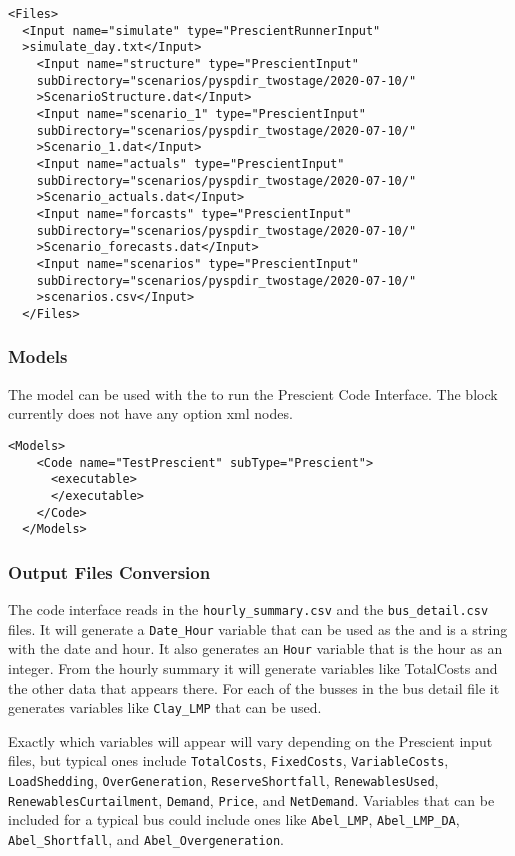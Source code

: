 \begin{lstlisting}[style=XML]
  <Files>
  <Input name="simulate" type="PrescientRunnerInput"
  >simulate_day.txt</Input>
    <Input name="structure" type="PrescientInput"
    subDirectory="scenarios/pyspdir_twostage/2020-07-10/"
    >ScenarioStructure.dat</Input>
    <Input name="scenario_1" type="PrescientInput"
    subDirectory="scenarios/pyspdir_twostage/2020-07-10/"
    >Scenario_1.dat</Input>
    <Input name="actuals" type="PrescientInput"
    subDirectory="scenarios/pyspdir_twostage/2020-07-10/"
    >Scenario_actuals.dat</Input>
    <Input name="forcasts" type="PrescientInput"
    subDirectory="scenarios/pyspdir_twostage/2020-07-10/"
    >Scenario_forecasts.dat</Input>
    <Input name="scenarios" type="PrescientInput"
    subDirectory="scenarios/pyspdir_twostage/2020-07-10/"
    >scenarios.csv</Input>
  </Files>
\end{lstlisting}

\subsubsection{Models}

The  model can be used with the
 to run the Prescient Code Interface.
The block currently does not have any option xml nodes.

\begin{lstlisting}[style=XML]
  <Models>
    <Code name="TestPrescient" subType="Prescient">
      <executable>
      </executable>
    </Code>
  </Models>
\end{lstlisting}

\subsubsection{Output Files Conversion}

The code interface reads in the \texttt{hourly\_summary.csv} and the
\texttt{bus\_detail.csv} files. It will generate a \texttt{Date\_Hour}
variable that can be used as the  and is a
string with the date and hour. It also generates an \texttt{Hour}
variable that is the hour as an integer.  From the hourly summary it
will generate variables like TotalCosts and the other data that
appears there.  For each of the busses in the bus detail file it
generates variables like \texttt{Clay\_LMP} that can be used.

Exactly which variables will appear will vary depending on the
Prescient input files, but typical ones include \texttt{TotalCosts},
\texttt{FixedCosts}, \texttt{VariableCosts}, \texttt{LoadShedding},
\texttt{OverGeneration}, \texttt{ReserveShortfall},
\texttt{RenewablesUsed}, \texttt{RenewablesCurtailment},
\texttt{Demand}, \texttt{Price}, and \texttt{NetDemand}. Variables
that can be included for a typical bus could include ones like
\texttt{Abel\_LMP}, \texttt{Abel\_LMP\_DA}, \texttt{Abel\_Shortfall},
and \texttt{Abel\_Overgeneration}.

